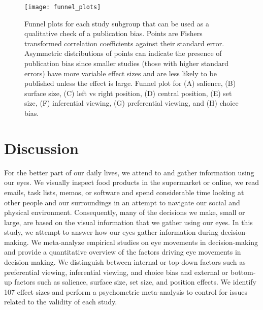 \documentclass{article}
\begin{document}
\begin{figure}%
\texttt{[image: funnel\_plots]}
\centering
\caption{Funnel plots for each study subgroup that can be used as a qualitative check of a publication bias. Points are Fishers transformed correlation coefficients against their standard error. Asymmetric distributions of points can indicate the presence of publication bias since smaller studies (those with higher standard errors) have more variable effect sizes and are less likely to be published unless the effect is large. Funnel plot for (A) salience, (B) surface size, (C) left vs right position, (D) central position, (E) set size, (F) inferential viewing, (G) preferential viewing, and (H) choice bias.}
\label{fig:funnel_plots}
\end{figure}




\section{Discussion}




For the better part of our daily lives, we attend to and gather information using our eyes. We visually inspect food products in the supermarket or online, we read emails, task lists, memos, or software and spend considerable time looking at other people and our surroundings in an attempt to navigate our social and physical environment. Consequently, many of the decisions we make, small or large, are based on the visual information that we gather using our eyes. In this study, we attempt to answer how our eyes gather information during decision-making. We meta-analyze empirical studies on eye movements in decision-making and provide a quantitative overview of the factors driving eye movements in decision-making. We distinguish between internal or top-down factors such as preferential viewing, inferential viewing, and choice bias and external or bottom-up factors such as salience, surface size, set size, and position effects. We identify 107 effect sizes and perform a psychometric meta-analysis to control for issues related to the validity of each study. 
\end{document}
